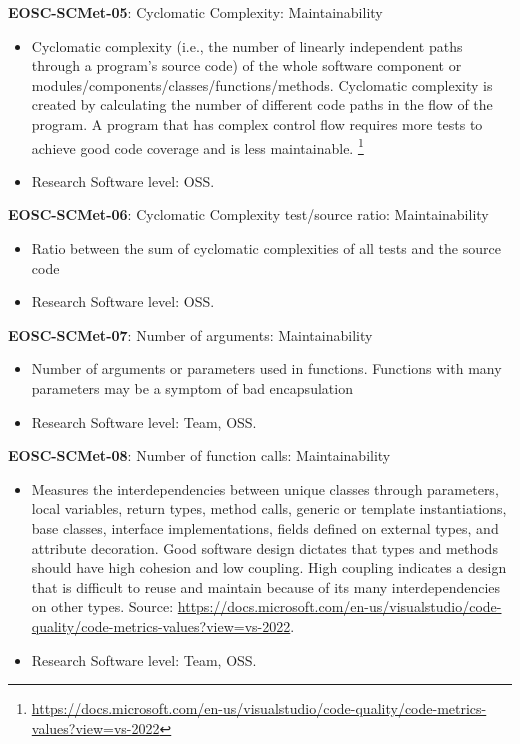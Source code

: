 \textbf{EOSC-SCMet-05}: Cyclomatic Complexity: Maintainability

\begin{itemize}
    \item Cyclomatic complexity (i.e.,  the number of linearly independent paths through a program's source code) of the whole software component or modules/components/classes/functions/methods. Cyclomatic complexity is created by calculating the number of different code paths in the flow of the program. A program that has complex control flow requires more tests to achieve good code coverage and is less maintainable. \footnote{\url{https://docs.microsoft.com/en-us/visualstudio/code-quality/code-metrics-values?view=vs-2022}} \cite{srisopha_software_2018,montagud_systematic_2012,baggen_standardized_2012,nagappan_early_2005}
    \item Research Software level: OSS.
\end{itemize}

\textbf{EOSC-SCMet-06}: Cyclomatic Complexity test/source ratio: Maintainability

\begin{itemize}
    \item Ratio between the sum of cyclomatic complexities of all tests and the source code \cite{nagappan_early_2005}
    \item Research Software level: OSS.
\end{itemize}

\textbf{EOSC-SCMet-07}: Number of arguments: Maintainability

\begin{itemize}
    \item Number of arguments or parameters used in functions. Functions with many parameters may be a symptom of bad encapsulation \cite{baggen_standardized_2012,ogasawara_experiences_1996}
    \item Research Software level: Team, OSS.
\end{itemize}

\textbf{EOSC-SCMet-08}: Number of function calls: Maintainability

\begin{itemize}
    \item Measures the interdependencies between unique classes through parameters, local variables, return types, method calls, generic or template instantiations, base classes, interface implementations, fields defined on external types, and attribute decoration. Good software design dictates that types and methods should have high cohesion and low coupling. High coupling indicates a design that is difficult to reuse and maintain because of its many interdependencies on other types. Source: \url{https://docs.microsoft.com/en-us/visualstudio/code-quality/code-metrics-values?view=vs-2022}. \cite{montagud_systematic_2012,ogasawara_experiences_1996}
    \item Research Software level: Team, OSS.
\end{itemize}

